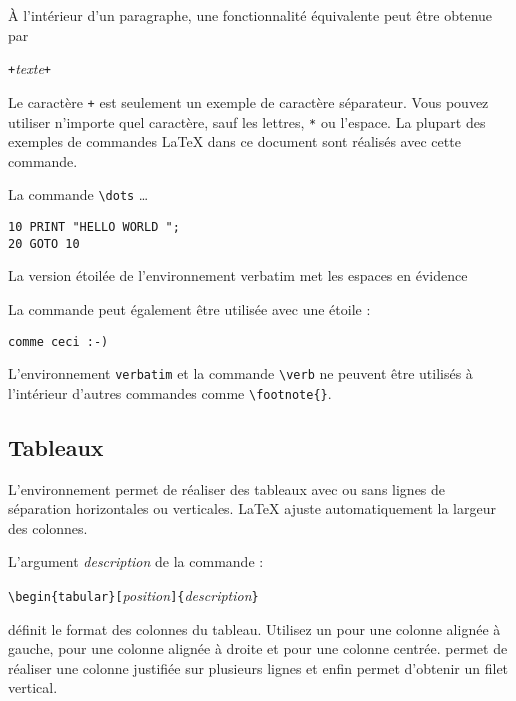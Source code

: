 À l'intérieur d'un paragraphe, une fonctionnalité équivalente peut
être obtenue par
\begin{lscommand}
\verb|+|\emph{texte}\verb|+|
\end{lscommand}
\noindent Le caractère \verb|+| est seulement un exemple de caractère
séparateur. Vous pouvez utiliser n'importe quel caractère, sauf les
lettres, \verb|*| ou l'espace. La plupart des exemples de commandes
\LaTeX{} dans ce document sont réalisés avec cette commande.

\begin{example}
La commande \verb|\dots| \dots

\begin{verbatim}
10 PRINT "HELLO WORLD ";
20 GOTO 10
\end{verbatim}
\end{example}

\begin{example}
\begin{verbatim*}
La version étoilée de
l'environnement  verbatim
met    les   espaces   en
évidence
\end{verbatim*}
\end{example}

La commande  peut également être utilisée avec une étoile :
\begin{example}
\verb*|comme ceci :-) |
\end{example}

L'environnement \texttt{verbatim} et la commande \verb|\verb| ne
peuvent être utilisés à l'intérieur d'autres commandes comme
\verb|\footnote{}|.


\subsection{Tableaux}

\newcommand{\mfr}[1]{\framebox{\rule{0pt}{0.7em}\texttt{#1}}}

L'environnement  permet de réaliser des tableaux avec ou
sans lignes de séparation horizontales ou verticales. \LaTeX{}
ajuste automatiquement la largeur des colonnes.

L'argument \emph{description} de la commande :
\begin{lscommand}
\verb|\begin{tabular}[|\emph{position}\verb|]{|\emph{description}\verb|}|
\end{lscommand}
\noindent définit le format des colonnes du tableau. Utilisez un
\mfr{l} pour une colonne alignée à gauche, \mfr{r} pour
une colonne alignée à droite et \mfr{c} pour une colonne
centrée. \mfr{p{\{\emph{largeur}\}}} permet de réaliser une colonne
justifiée sur plusieurs lignes et enfin
\mfr{|} permet d'obtenir un filet vertical.

